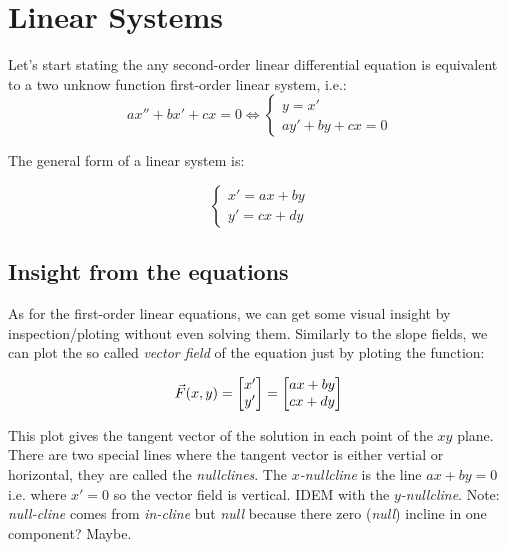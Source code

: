 \documentclass[../ode.tex]{subfiles}
\begin{document}
    \chapter{\sffamily Linear Systems}
    Let's start stating the any second-order linear differential equation is equivalent to a two unknow function first-order
    linear system, i.e.:
    \begin{equation*}
        ax'' + bx' + cx = 0 \iff 
        \begin{cases}
            y=x'\\
            ay' + by +cx =0
        \end{cases}  
    \end{equation*}
    
    The general form of a linear system is: 

    \begin{equation*}
        \begin{cases}
            x'=ax+by\\
            y'=cx+dy
        \end{cases}
    \end{equation*}
    

    \section{\sffamily Insight from the equations}
    
    As for the first-order linear equations, we can get some visual insight by inspection/ploting without even
    solving them. Similarly to the slope fields, we can plot the so called \emph{vector field} of the
    equation just by ploting the function:

    \begin{equation*}
        \vec{F}(x,y) =\begin{bmatrix} x'\\y' \end{bmatrix}  =\begin{bmatrix} ax+by\\cx+dy \end{bmatrix}\\
    \end{equation*}
    
    This plot gives the tangent vector of the solution in each point of the $xy$ plane. There are two special lines
    where the tangent vector is either vertial or horizontal, they are called the \emph{nullclines}. The \emph{$x$-nullcline} is
    the line $ax+by=0$ i.e. where $x'=0$ so the vector field is vertical. IDEM with the \emph{$y$-nullcline}. Note:
    \emph{null-cline} comes from \emph{in-cline} but \emph{null} because there zero (\emph{null}) incline in one component? Maybe.
    
\end{document}
